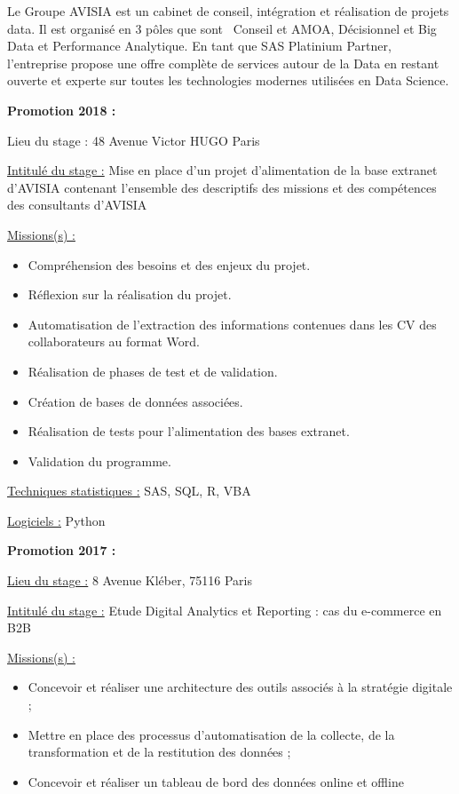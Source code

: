 \documentclass[
  letterpaper,
  DIV=11,
  numbers=noendperiod]{scrreprt}
\begin{document}
Le Groupe AVISIA est un cabinet de conseil, intégration et réalisation
de projets data. Il est organisé en 3 pôles que sont~ Conseil et AMOA,
Décisionnel et Big Data et Performance Analytique. En tant que SAS
Platinium Partner, l'entreprise propose une offre complète de services
autour de la Data en restant ouverte et experte sur toutes les
technologies modernes utilisées en Data Science.

\textbf{Promotion 2018 :}

Lieu du stage : 48 Avenue Victor HUGO Paris

\uline{Intitulé du stage :} Mise en place d'un projet d'alimentation de
la base extranet d'AVISIA contenant l'ensemble des descriptifs des
missions et des compétences des consultants d'AVISIA

\uline{Missions(s) :}

\begin{itemize}
\item
  Compréhension des besoins et des enjeux du projet.
\item
  Réflexion sur la réalisation du projet.
\item
  Automatisation de l'extraction des informations contenues dans les CV
  des collaborateurs au format Word.
\item
  Réalisation de phases de test et de validation.
\item
  Création de bases de données associées.
\item
  Réalisation de tests pour l'alimentation des bases extranet.
\item
  Validation du programme.
\end{itemize}

\uline{Techniques statistiques :} SAS, SQL, R, VBA

\uline{Logiciels :} Python

\textbf{Promotion 2017 :}

\uline{Lieu du stage :} 8 Avenue Kléber, 75116 Paris

\uline{Intitulé du stage :} Etude Digital Analytics et Reporting : cas
du e-commerce en B2B

\uline{Missions(s) :}

\begin{itemize}
\item
  Concevoir et réaliser une architecture des outils associés à la
  stratégie digitale ;
\item
  Mettre en place des processus d'automatisation de la collecte, de la
  transformation et de la restitution des données ;
\item
  Concevoir et réaliser un tableau de bord des données online et offline
\end{itemize}
\end{document}
